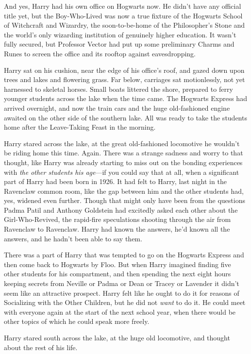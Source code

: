 And yes, Harry had his own office on Hogwarts now. He didn't have any official
title yet, but the Boy-Who-Lived was now a true fixture of the Hogwarts School
of Witchcraft and Wizardry, the soon-to-be-home of the Philosopher's Stone and
the world's only wizarding institution of genuinely higher education. It wasn't
fully secured, but Professor Vector had put up some preliminary Charms and
Runes to screen the office and its rooftop against eavesdropping.

Harry sat on his cushion, near the edge of his office's roof, and gazed down
upon trees and lakes and flowering grass. Far below, carriages sat
motionlessly, not yet harnessed to skeletal horses. Small boats littered the
shore, prepared to ferry younger students across the lake when the time came.
The Hogwarts Express had arrived overnight, and now the train cars and the huge
old-fashioned engine awaited on the other side of the southern lake. All was
ready to take the students home after the Leave-Taking Feast in the morning.

Harry stared across the lake, at the great old-fashioned locomotive he wouldn't
be riding home this time. Again. There was a strange sadness and worry to that
thought, like Harry was already starting to miss out on the bonding experiences
with \emph{the other students his age}---if you could say that at all, when a
significant part of Harry had been born in 1926. It had felt to Harry, last
night in the Ravenclaw common room, like the gap between him and the other
students had, yes, widened even further. Though that might only have been from
the questions Padma Patil and Anthony Goldstein had excitedly asked each other
about the Girl-Who-Revived, the rapid-fire speculations shooting through the
air from Ravenclaw to Ravenclaw. Harry had known the answers, he'd known all
the answers, and he hadn't been able to say them.

There was a part of Harry that was tempted to go on the Hogwarts Express and
then come back to Hogwarts by Floo. But when Harry imagined finding five other
students for his compartment, and then spending the next eight hours keeping
secrets from Neville or Padma or Dean or Tracey or Lavender{\el} it didn't
seem like an attractive prospect. Harry felt like he ought to do it for reasons
of Socializing with the Other Children, but he did not \emph{want} to do it. He
could meet with everyone again at the start of the next school year, when there
would be other topics of which he could speak more freely.

Harry stared south across the lake, at the huge old locomotive, and thought
about the rest of his life.

